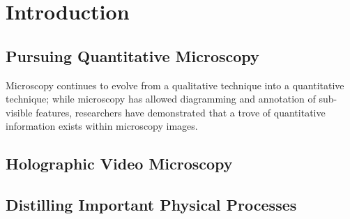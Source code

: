 \chapter{Introduction}
\label{ch:intro}





\section{Pursuing Quantitative Microscopy}

Microscopy continues to evolve from a qualitative technique into a
quantitative technique; while microscopy has allowed diagramming
and annotation of sub-visible features, researchers have demonstrated
that a trove of quantitative information exists within microscopy images.


\section{Holographic Video Microscopy}




\section{Distilling Important Physical Processes}



